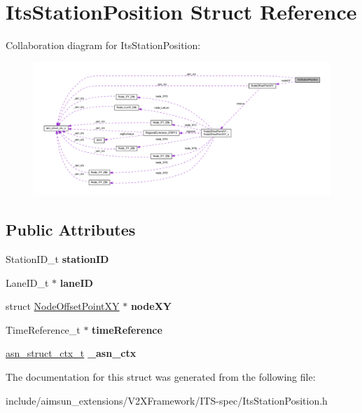 \hypertarget{structItsStationPosition}{}\section{Its\+Station\+Position Struct Reference}
\label{structItsStationPosition}


Collaboration diagram for Its\+Station\+Position\+:\nopagebreak
\begin{figure}[H]
\begin{center}
\leavevmode
\includegraphics[width=350pt]{structItsStationPosition__coll__graph}
\end{center}
\end{figure}
\subsection*{Public Attributes}
\begin{DoxyCompactItemize}
\item 
Station\+I\+D\+\_\+t {\bfseries station\+ID}\hypertarget{structItsStationPosition_a452672536cfc91f404b6a9b0f4bea77d}{}\label{structItsStationPosition_a452672536cfc91f404b6a9b0f4bea77d}

\item 
Lane\+I\+D\+\_\+t $\ast$ {\bfseries lane\+ID}\hypertarget{structItsStationPosition_a791d6a23d5d16386773bd784b6653b65}{}\label{structItsStationPosition_a791d6a23d5d16386773bd784b6653b65}

\item 
struct \hyperlink{structNodeOffsetPointXY}{Node\+Offset\+Point\+XY} $\ast$ {\bfseries node\+XY}\hypertarget{structItsStationPosition_aa3fe84ace9b41bf260661d9abc69e059}{}\label{structItsStationPosition_aa3fe84ace9b41bf260661d9abc69e059}

\item 
Time\+Reference\+\_\+t $\ast$ {\bfseries time\+Reference}\hypertarget{structItsStationPosition_ae8159f12c68dd05a719fdb05f030c882}{}\label{structItsStationPosition_ae8159f12c68dd05a719fdb05f030c882}

\item 
\hyperlink{structasn__struct__ctx__s}{asn\+\_\+struct\+\_\+ctx\+\_\+t} {\bfseries \+\_\+asn\+\_\+ctx}\hypertarget{structItsStationPosition_a1c9da6d7acad0be51c59ea3f71fe4357}{}\label{structItsStationPosition_a1c9da6d7acad0be51c59ea3f71fe4357}

\end{DoxyCompactItemize}


The documentation for this struct was generated from the following file\+:\begin{DoxyCompactItemize}
\item 
include/aimsun\+\_\+extensions/\+V2\+X\+Framework/\+I\+T\+S-\/spec/Its\+Station\+Position.\+h\end{DoxyCompactItemize}
